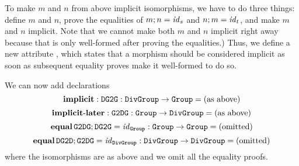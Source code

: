 To make $m$ and $n$ from above implicit isomorphisms, we have to do three things: define $m$ and $n$, prove the equalities of $m;n=\mathit{id}_{s}$ and $n;m=\mathit{id}_{t}$, and make $m$ and $n$ implicit.
Note that we cannot make both $m$ and $n$ implicit right away because that is only well-formed after proving the equalities.)
Thus, we define a new attribute , which states that a morphism should be considered implicit as soon as subsequent equality proves make it well-formed to do so.

\begin{example}[Isomorphisms]
We can now add declarations
 \[\operatorname{\mathbf{implicit}}:\operatorname{\mathtt{DG2G}}:\operatorname{\mathtt{DivGroup}}\to\operatorname{\mathtt{Group}}=\text{(as above)}\]
 \[\operatorname{\mathbf{implicit-later}}:\operatorname{\mathtt{G2DG}}:\operatorname{\mathtt{Group}}\to\operatorname{\mathtt{DivGroup}}=\text{(as above)}\]
 \[\operatorname{\mathbf{equal}}\operatorname{\mathtt{G2DG}};\operatorname{\mathtt{DG2G}}=\mathit{id}_{\operatorname{\mathtt{Group}}}:\operatorname{\mathtt{Group}}\to\operatorname{\mathtt{Group}}=\text{(omitted)}\]
 \[\operatorname{\mathbf{equal}}\operatorname{\mathtt{DG2D}};\operatorname{\mathtt{G2DG}}=\mathit{id}_{\operatorname{\mathtt{DivGroup}}}:\operatorname{\mathtt{DivGroup}}\to\operatorname{\mathtt{DivGroup}}=\text{(omitted)}\]
where the isomorphisms are as above and we omit all the equality proofs.
\end{example}


%
%
%
%

